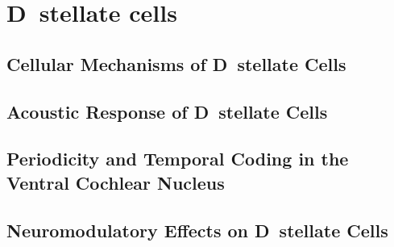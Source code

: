 \section{D~stellate cells}


\subsection{Cellular Mechanisms of D~stellate Cells}

\subsection{Acoustic Response of D~stellate  Cells}

\subsection{Periodicity and Temporal Coding in the Ventral Cochlear Nucleus}


\subsection{Neuromodulatory Effects on D~stellate Cells}



